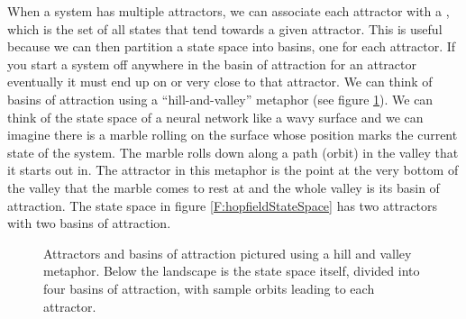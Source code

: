 When a system has multiple attractors, we can associate each attractor with a , which is the set of all states that tend towards a
given attractor. This is useful because we can then partition a state space into basins, one for each attractor. If you start a system off anywhere in the basin of attraction for an attractor eventually it must end up on or very close to that attractor.
We can think of basins of attraction using a ``hill-and-valley'' metaphor  (see
figure \ref{F:basins}). We can think of the state space of a neural network
like a wavy surface and we can imagine there is a marble rolling on the surface
whose position marks the current state of the system. The marble rolls down
along a path (orbit) in the valley that it starts out in. The attractor in
this metaphor is the point at the very bottom of the valley that the marble
comes to rest at and the whole valley is its basin of attraction. The state space in figure \ref{F:hopfieldStateSpace} has two attractors with two basins of attraction.
\begin{figure}[h]
\centering
{}
\caption[Jeff Yoshimi.]{Attractors and basins of attraction pictured using a hill and valley
metaphor. Below the landscape is the state space itself, divided into four basins of attraction, with sample orbits leading to each attractor.}
\label{F:basins}
\end{figure}

